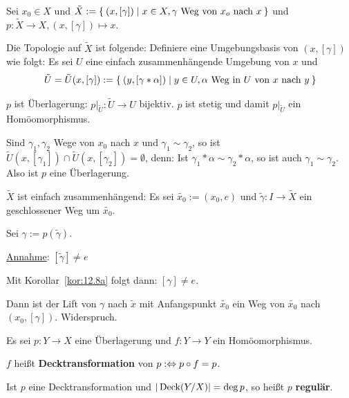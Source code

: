 \begin{beweis}
    Sei $x_0 \in X$ und $\tilde{X} := \Set{(x, [\gamma]) | x \in X, \gamma \text{ Weg von } x_o \text{ nach } x}$
    und $p: \tilde{X} \rightarrow X, (x, [\gamma]) \mapsto x$.

    Die Topologie auf $\tilde{X}$ ist folgende:
    Definiere eine Umgebungsbasis von $(x, [\gamma])$ wie folgt:
    Es sei $U$ eine einfach zusammenhängende Umgebung von $x$ und
    \[\tilde{U} = \tilde{U}(x, [\gamma]) := \Set{(y, [\gamma * \alpha]) | y \in U, \alpha \text{ Weg in } U \text{ von } x \text{ nach } y} \]

    $p$ ist Überlagerung: $p|_{\tilde{U}} : \tilde{U} \rightarrow U$
    bijektiv. $p$ ist stetig und damit $p|_{\tilde{U}}$ ein 
    Homöomorphismus.

    Sind $\gamma_1, \gamma_2$ Wege von $x_0$ nach $x$ und $\gamma_1 \sim \gamma_2$,
    so ist $\tilde{U}(x, [\gamma_1]) \cap \tilde{U}(x, [\gamma_2]) = \emptyset$,
    denn: Ist $\gamma_1 * \alpha \sim \gamma_2 * \alpha$, so ist auch
    $\gamma_1 \sim \gamma_2$. Also ist $p$ eine Überlagerung.

    $\tilde{X}$ ist einfach zusammenhängend: Es sei $\tilde{x_0} := (x_0, e)$
    und $\tilde{\gamma}: I \rightarrow \tilde{X}$ ein geschlossener
    Weg um $\tilde{x_0}$.

    Sei $\gamma := p(\tilde{\gamma})$.

    \underline{Annahme}: $[\tilde{\gamma}] \neq e$

    Mit Korollar~\ref{kor:12.8a} folgt dann: $[\gamma] \neq e$.

    Dann ist der Lift von $\gamma$ nach $\tilde{x}$ mit Anfangspunkt
    $\tilde{x_0}$ ein Weg von $\tilde{x_0}$ nach $(x_0, [\gamma])$.
    Widerspruch.
\end{beweis}

\begin{definition}%
    Es sei $p:Y \rightarrow X$ eine Überlagerung und $f:Y \rightarrow Y$
    ein Homöomorphismus.

    $f$ heißt \textbf{Decktransformation} von $p :\Leftrightarrow p \circ f = p$.

    Ist $p$ eine Decktransformation und $|\operatorname{Deck}(Y/X)| = \deg{p}$,
    so heißt $p$ \textbf{regulär}.
\end{definition}

